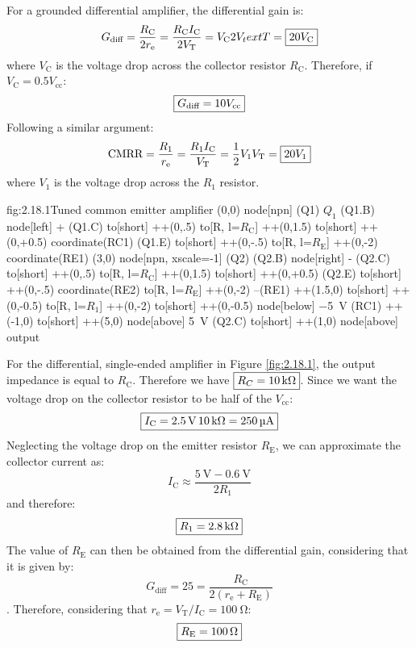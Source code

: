 For a grounded differential amplifier, the differential gain is:
\[G_\text{diff}=\frac{R_\text{C}}{2r_\text{e}}=\frac{R_\text{C}I_\text{C}}{2V_\text{T}}={V_\text{C}}{2V_text{T}}=\boxed{20V_\text{C}}\]
where $V_\text{C}$ is the voltage drop across the collector resistor $R_\text{C}$. Therefore, if $V_\text{C}=0.5V_\text{cc}$:
\[\boxed{G_\text{diff}=10V_\text{cc}}\]
Following a similar argument:
\[\text{CMRR}=\frac{R_1}{r_\text{e}}=\frac{R_1I_\text{C}}{V_\text{T}}=\frac{1}{2}{V_1}{V_\text{T}}=\boxed{20V_1}\]
where $V_1$ is the voltage drop across the $R_1$ resistor.
\begin{circuit}{fig:2.18.1}{Tuned common emitter amplifier}
    (0,0) node[npn] (Q1) {$Q_1$}
    (Q1.B) node[left] {+}
    (Q1.C) to[short] ++(0,.5)
    to[R, l=$R_\text{C}$] ++(0,1.5)
    to[short] ++(0,+0.5) coordinate(RC1)
    (Q1.E) to[short] ++(0,-.5) 
    to[R, l=$R_\text{E}$] ++(0,-2) coordinate(RE1)
    (3,0) node[npn, xscale=-1] (Q2) {}
    (Q2.B) node[right] {-}
    (Q2.C) to[short] ++(0,.5)
    to[R, l=$R_\text{C}$] ++(0,1.5)
    to[short] ++(0,+0.5)
    (Q2.E) to[short] ++(0,-.5) coordinate(RE2)
    to[R, l=$R_\text{E}$] ++(0,-2)
    --(RE1)
    ++(1.5,0) to[short] ++(0,-0.5)
    to[R, l=$R_1$] ++(0,-2)
    to[short] ++(0,-0.5)
    node[below] {\SI{-5}{\volt}}
    (RC1) ++(-1,0) to[short] ++(5,0)
    node[above] {\SI{+5}{\volt}}
    (Q2.C) to[short] ++(1,0)
    node[above] {output}
\end{circuit}
For the differential, single-ended amplifier in Figure \ref{fig:2.18.1}, the output impedance is equal to $R_\text{C}$. Therefore we have $\boxed{R_C=\SI{10}{\kilo\ohm}}$. Since we want the voltage drop on the collector resistor to be half of the $V_\text{cc}$:
\[\boxed{I_\text{C}={\SI{2.5}{\volt}}\,{\SI{10}{\kilo\ohm}}=\SI{250}{\micro\ampere}}\]
Neglecting the voltage drop on the emitter resistor $R_\text{E}$, we can approximate the collector current as:
\[I_\text{C}\approx\frac{\SI{5}{\volt}-\SI{0.6}{\volt}}{2R_1}\]
and therefore:
\[\boxed{R_1=\SI{2.8}{\kilo\ohm}}\]
The value of $R_\text{E}$ can then be obtained from the differential gain, considering that it is given by:
\[G_\text{diff}=25=\frac{R_\text{C}}{2\left(r_\text{e}+R_\text{E}\right)}\].
Therefore, considering that $r_\text{e}=V_\text{T}/I_\text{C}=\SI{100}{\ohm}$:
\[\boxed{R_\text{E}=\SI{100}{\ohm}}\]

